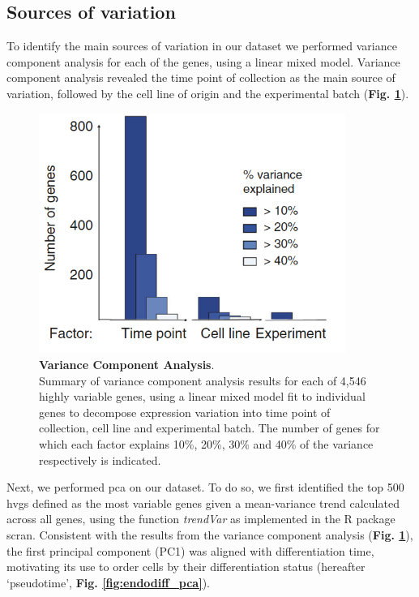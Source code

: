 \newpage

\subsection{Sources of variation} 
\label{sec:endodiff_sources_of_variation}


To identify the main sources of variation in our dataset we performed variance component analysis for each of the genes, using a linear mixed model.
Variance component analysis revealed the time point of collection as the main source of variation, followed by the cell line of origin and the experimental batch (\textbf{Fig. \ref{fig:endodiff_vca}}).\\

\begin{figure}[h]
\includegraphics[width=10cm]{Chapter4/Fig/endodiff_variance_component.png}
\caption[Variance Component Analysis]{\textbf{Variance Component Analysis}.\\
Summary of variance component analysis results for each of 4,546 highly variable genes, using a linear mixed model fit to individual genes to decompose expression variation into
time point of collection, cell line and experimental batch.
The number of genes for which each factor explains 10\%, 20\%, 30\% and 40\% of the variance respectively is indicated.}
\label{fig:endodiff_vca}
\end{figure}

Next, we performed \gls{pca} on our dataset.
To do so, we first identified the top 500 \gls{hvgs} defined as the most variable genes given a mean-variance trend calculated across all genes, using the function \textit{trendVar} as implemented in the R package scran.
Consistent with the results from the variance component analysis (\textbf{Fig. \ref{fig:endodiff_vca}}), the first principal component (PC1) was aligned with differentiation time, motivating its use to order cells by their differentiation status (hereafter `pseudotime', \textbf{Fig. \ref{fig:endodiff_pca}}).\\

